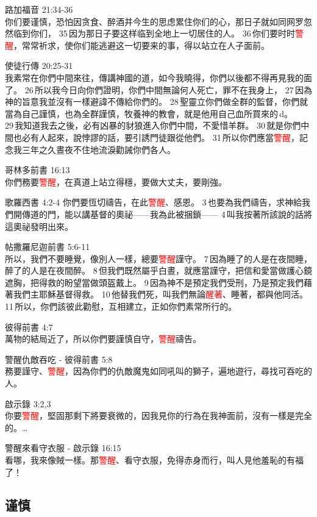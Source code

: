 路加福音 21:34-36\\
你们要谨慎，恐怕因贪食、醉酒并今生的思虑累住你们的心，那日子就如同网罗忽然临到你们， 35 因为那日子要这样临到全地上一切居住的人。 36 你们要时时\textcolor{red}{警醒}，常常祈求，使你们能逃避这一切要来的事，得以站立在人子面前。

使徒行傳 20:25-31\\
我素常在你們中間來往，傳講神國的道，如今我曉得，你們以後都不得再見我的面了。 26 所以我今日向你們證明，你們中間無論何人死亡，罪不在我身上， 27 因為神的旨意我並沒有一樣避諱不傳給你們的。 28 聖靈立你們做全群的監督，你們就當為自己謹慎，也為全群謹慎，牧養神的教會，就是他用自己血所買來的 d。 29 我知道我去之後，必有凶暴的豺狼進入你們中間，不愛惜羊群。 30 就是你們中間也必有人起來，說悖謬的話，要引誘門徒跟從他們。 31 所以你們應當\textcolor{red}{警醒}，記念我三年之久晝夜不住地流淚勸誡你們各人。

哥林多前書 16:13\\
你們務要\textcolor{red}{警醒}，在真道上站立得穩，要做大丈夫，要剛強。

歌羅西書 4:2-4
你們要恆切禱告，在此\textcolor{red}{警醒}、感恩。 3 也要為我們禱告，求神給我們開傳道的門，能以講基督的奧祕——我為此被捆鎖—— 4 叫我按著所該說的話將這奧祕發明出來。

帖撒羅尼迦前書 5:6-11\\
所以，我們不要睡覺，像別人一樣，總要\textcolor{red}{警醒}謹守。 7 因為睡了的人是在夜間睡，醉了的人是在夜間醉。 8 但我們既然屬乎白晝，就應當謹守，把信和愛當做護心鏡遮胸，把得救的盼望當做頭盔戴上。 9 因為神不是預定我們受刑，乃是預定我們藉著我們主耶穌基督得救。 10 他替我們死，叫我們無論\textcolor{red}{醒著}、睡著，都與他同活。 11 所以，你們該彼此勸慰，互相建立，正如你們素常所行的。

彼得前書 4:7\\
萬物的結局近了，所以你們要謹慎自守，\textcolor{red}{警醒}禱告。

警醒仇敵吞吃 - 彼得前書 5:8\\
務要謹守、\textcolor{red}{警醒}，因為你們的仇敵魔鬼如同吼叫的獅子，遍地遊行，尋找可吞吃的人。

啟示錄 3:2,3\\
你要\textcolor{red}{警醒}，堅固那剩下將要衰微的，因我見你的行為在我神面前，沒有一樣是完全的。…

警醒來看守衣服 - 啟示錄 16:15\\
看哪，我來像賊一樣。那\textcolor{red}{警醒}、看守衣服，免得赤身而行，叫人見他羞恥的有福了！



\subsection{谨慎}
